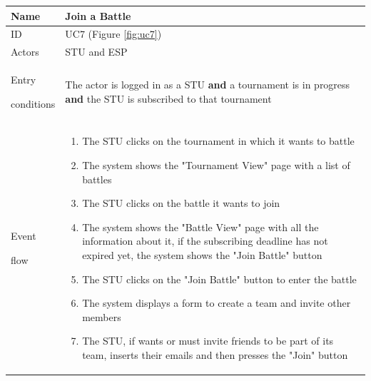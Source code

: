 \begin{center}
    \def\arraystretch{1.5}
    \begin{tabular}{| m{2cm} | m{10cm}|}
        \hline
        Name                  & Join a Battle                                                                                                                                                                       \\ \hline
        ID                    & UC7 (Figure \ref{fig:uc7})                                                                                                                                                          \\ \hline
        Actors                & STU and ESP                                                                                                                                                                         \\ \hline
        Entry \par conditions & The actor is logged in as a STU \textbf{and} a tournament is in progress \textbf{and} the STU is subscribed to that tournament                                                      \\ \hline
        Event \par flow       & \begin{enumerate}
                                    \item The STU clicks on the tournament in which it wants to battle
                                    \item The system shows the "Tournament View" page with a list of battles
                                    \item The STU clicks on the battle it wants to join
                                    \item The system shows the "Battle View" page with all the information about it, if the subscribing deadline has not expired yet, the system shows the "Join Battle" button
                                    \item The STU clicks on the "Join Battle" button to enter the battle
                                    \item The system displays a form to create a team and invite other members
                                    \item The STU, if wants or must invite friends to be part of its team, inserts their emails and then presses the "Join" button

\end{enumerate}
\end{tabular}
\end{center}
